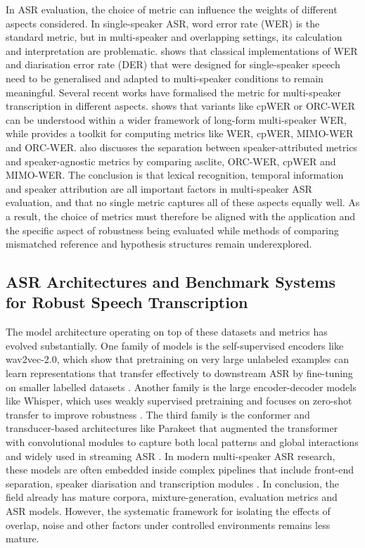 In ASR evaluation, the choice of metric can influence the weights of different aspects considered. In single-speaker ASR, word error rate (WER) is the standard metric, but in multi-speaker and overlapping settings, its calculation and interpretation are problematic. \citet{galibert2013methodologies} shows that classical implementations of WER and diarisation error rate (DER) that were designed for single-speaker speech need to be generalised and adapted to multi-speaker conditions to remain meaningful. Several recent works have formalised the metric for multi-speaker transcription in different aspects. \citet{von_Neumann_2023} shows that variants like cpWER or ORC-WER can be understood within a wider framework of long-form multi-speaker WER, while \citet{vonneumann2024meetevaltoolkitcomputationword} provides a toolkit for computing metrics like WER, cpWER, MIMO-WER and ORC-WER. \citet{von_Neumann_2023} also discusses the separation between speaker-attributed metrics and speaker-agnostic metrics by comparing asclite, ORC-WER, cpWER and MIMO-WER. The conclusion is that lexical recognition, temporal information and speaker attribution are all important factors in multi-speaker ASR evaluation, and that no single metric captures all of these aspects equally well. As a result, the choice of metrics must therefore be aligned with the application and the specific aspect of robustness being evaluated while methods of comparing mismatched reference and hypothesis structures remain underexplored.

\subsection{ASR Architectures and Benchmark Systems for Robust Speech Transcription}
The model architecture operating on top of these datasets and metrics has evolved substantially. One family of models is the self-supervised encoders like wav2vec-2.0, which show that pretraining on very large unlabeled examples can learn representations that transfer effectively to downstream ASR by fine-tuning on smaller labelled datasets \cite{baevski2020wav2vec20frameworkselfsupervised}. Another family is the large encoder-decoder models like Whisper, which uses weakly supervised pretraining and focuses on zero-shot transfer to improve robustness \cite{radford2022robustspeechrecognitionlargescale}. The third family is the conformer and transducer-based architectures like Parakeet that augmented the transformer with convolutional modules to capture both local patterns and global interactions and widely used in streaming ASR \cite{sekoyan2025canary1bv2parakeettdt06bv3efficient}. In modern multi-speaker ASR research, these models are often embedded inside complex pipelines that include front-end separation, speaker diarisation and transcription modules \citep{raj2020integrationspeechseparationdiarization, vonneumann2024meetingrecognitioncontinuousspeech}. In conclusion, the field already has mature corpora, mixture-generation, evaluation metrics and ASR models. However, the systematic framework for isolating the effects of overlap, noise and other factors under controlled environments remains less mature.


